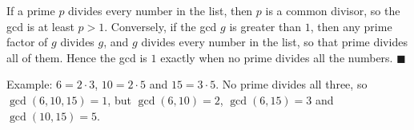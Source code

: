 If a prime $p$ divides every number in the list, then $p$ is a common divisor, so the gcd is at least $p>1$. Conversely, if the gcd $g$ is greater than $1$, then any prime factor of $g$ divides $g$, and $g$ divides every number in the list, so that prime divides all of them. Hence the gcd is $1$ exactly when no prime divides all the numbers. $\blacksquare$

Example: $6=2\cdot3$, $10=2\cdot5$ and $15=3\cdot5$. No prime divides all three, so $\gcd(6,10,15)=1$, but $\gcd(6,10)=2$, $\gcd(6,15)=3$ and $\gcd(10,15)=5$.
